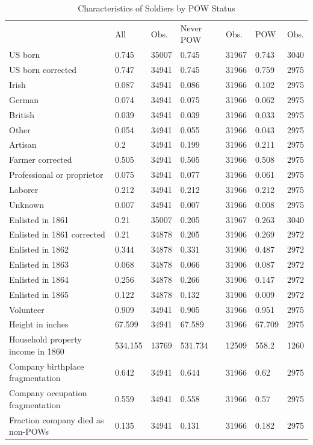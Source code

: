\documentclass[a4paper]{report}\usepackage{graphicx, color}
\begin{document}
\begin{refsection}
\begin{table}[bt]
\centering
\caption{Characteristics of Soldiers by POW Status}
\label{characteristics}
\begin{tabular}{lllllll}
\hline
                           & All   & Obs.  & Never POW & Obs.  & POW   & Obs. \\
US born                    & 0.745 & 35007 & 0.745     & 31967 & 0.743 & 3040 \\
US born corrected          & 0.747 & 34941 & 0.745     & 31966 & 0.759 & 2975 \\
Irish                      & 0.087 & 34941 & 0.086     & 31966 & 0.102 & 2975 \\
German                     & 0.074 & 34941 & 0.075     & 31966 & 0.062 & 2975 \\
British                    & 0.039 & 34941 & 0.039     & 31966 & 0.033 & 2975 \\
Other                      & 0.054 & 34941 & 0.055     & 31966 & 0.043 & 2975 \\
Artisan                    & 0.2   & 34941 & 0.199     & 31966 & 0.211 & 2975 \\
Farmer corrected           & 0.505 & 34941 & 0.505     & 31966 & 0.508 & 2975 \\
Professional or proprietor & 0.075 & 34941 & 0.077     & 31966 & 0.061 & 2975 \\
Laborer                    & 0.212 & 34941 & 0.212     & 31966 & 0.212 & 2975 \\
Unknown                    & 0.007 & 34941 & 0.007     & 31966 & 0.008 & 2975 \\
Enlisted in 1861           & 0.21  & 35007 & 0.205     & 31967 & 0.263 & 3040 \\
Enlisted in 1861 corrected & 0.21  & 34878 & 0.205     & 31906 & 0.269 & 2972 \\
Enlisted in 1862                  & 0.344   & 34878 & 0.331   & 31906 & 0.487  & 2972 \\
Enlisted in 1863                  & 0.068   & 34878 & 0.066   & 31906 & 0.087  & 2972 \\
Enlisted in 1864                  & 0.256   & 34878 & 0.266   & 31906 & 0.147  & 2972 \\
Enlisted in 1865                  & 0.122   & 34878 & 0.132   & 31906 & 0.009  & 2972 \\
Volunteer                         & 0.909   & 34941 & 0.905   & 31966 & 0.951  & 2975 \\
Height in inches                  & 67.599  & 34941 & 67.589  & 31966 & 67.709 & 2975 \\
Household property income in 1860 & 534.155 & 13769 & 531.734 & 12509 & 558.2  & 1260 \\
Company birthplace fragmentation  & 0.642   & 34941 & 0.644   & 31966 & 0.62   & 2975 \\
Company occupation fragmentation  & 0.559   & 34941 & 0.558   & 31966 & 0.57   & 2975 \\
Fraction company died as non-POWs & 0.135   & 34941 & 0.131   & 31966 & 0.182  & 2975 \\
\end{tabular}
\end{table}


\end{refsection}
\end{document}
